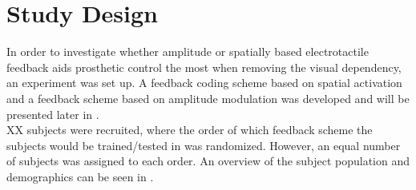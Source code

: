 \section{Study Design}

In order to investigate whether amplitude or spatially based electrotactile feedback aids prosthetic control the most when removing the visual dependency, an experiment was set up. A feedback coding scheme based on spatial activation and a feedback scheme based on amplitude modulation was developed and will be presented later in . \\
XX subjects were recruited, where the order of which feedback scheme the subjects would be trained/tested in was randomized. However, an equal number of subjects was assigned to each order. An overview of the subject population and demographics can be seen in . 

